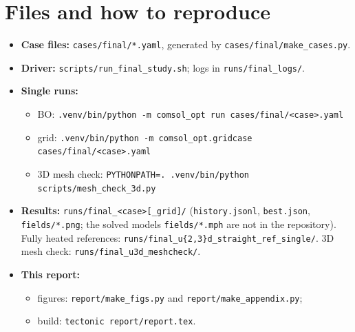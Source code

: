\documentclass[11pt,a4paper]{article}
\begin{document}
\section{Files and how to reproduce}
\begin{itemize}
  \item \textbf{Case files:} \texttt{cases/final/*.yaml}, generated by \texttt{cases/final/make\_cases.py}.
  \item \textbf{Driver:} \texttt{scripts/run\_final\_study.sh}; logs in \texttt{runs/final\_logs/}.
  \item \textbf{Single runs:}
  \begin{itemize}
    \item BO: \texttt{.venv/bin/python -m comsol\_opt run cases/final/<case>.yaml}
    \item grid: \texttt{.venv/bin/python -m comsol\_opt.gridcase cases/final/<case>.yaml}
    \item 3D mesh check: \texttt{PYTHONPATH=. .venv/bin/python scripts/mesh\_check\_3d.py}
  \end{itemize}
  \item \textbf{Results:} \texttt{runs/final\_<case>[\_grid]/} (\texttt{history.jsonl}, \texttt{best.json},
        \texttt{fields/*.png}; the solved models \texttt{fields/*.mph} are not in the repository). Fully heated references:
        \texttt{runs/final\_u\{2,3\}d\_straight\_ref\_single/}. 3D mesh check: \texttt{runs/final\_u3d\_meshcheck/}.
  \item \textbf{This report:}
  \begin{itemize}
    \item figures: \texttt{report/make\_figs.py} and \texttt{report/make\_appendix.py};
    \item build: \texttt{tectonic report/report.tex}.
  \end{itemize}
\end{itemize}

\appendix

\end{document}

